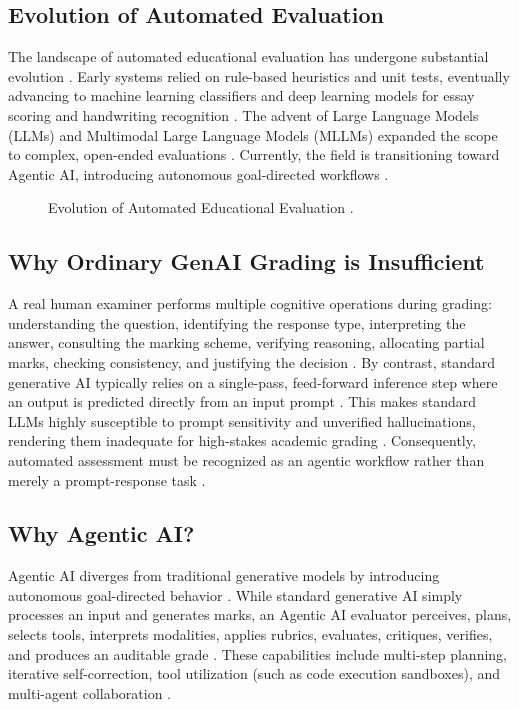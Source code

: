\documentclass[11pt,a4paper]{article}
\begin{document}
\subsection{Evolution of Automated Evaluation}
The landscape of automated educational evaluation has undergone substantial evolution \cite{P013}. Early systems relied on rule-based heuristics and unit tests, eventually advancing to machine learning classifiers and deep learning models for essay scoring and handwriting recognition \cite{P007, P026}. The advent of Large Language Models (LLMs) and Multimodal Large Language Models (MLLMs) expanded the scope to complex, open-ended evaluations \cite{P020}. Currently, the field is transitioning toward Agentic AI, introducing autonomous goal-directed workflows \cite{P002, P011}. 

\begin{figure}[H]
\centering
{}
\caption{Evolution of Automated Educational Evaluation \cite{P013}.}
\label{fig:evolution}
\end{figure}

\subsection{Why Ordinary GenAI Grading is Insufficient}
A real human examiner performs multiple cognitive operations during grading: understanding the question, identifying the response type, interpreting the answer, consulting the marking scheme, verifying reasoning, allocating partial marks, checking consistency, and justifying the decision \cite{P008, P019}. By contrast, standard generative AI typically relies on a single-pass, feed-forward inference step where an output is predicted directly from an input prompt \cite{P003}. This makes standard LLMs highly susceptible to prompt sensitivity and unverified hallucinations, rendering them inadequate for high-stakes academic grading \cite{P028}. Consequently, automated assessment must be recognized as an agentic workflow rather than merely a prompt-response task \cite{P012}.

\subsection{Why Agentic AI?}
Agentic AI diverges from traditional generative models by introducing autonomous goal-directed behavior \cite{P011}. While standard generative AI simply processes an input and generates marks, an Agentic AI evaluator perceives, plans, selects tools, interprets modalities, applies rubrics, evaluates, critiques, verifies, and produces an auditable grade \cite{P021}. These capabilities include multi-step planning, iterative self-correction, tool utilization (such as code execution sandboxes), and multi-agent collaboration \cite{P012, P027}.
\end{document}
